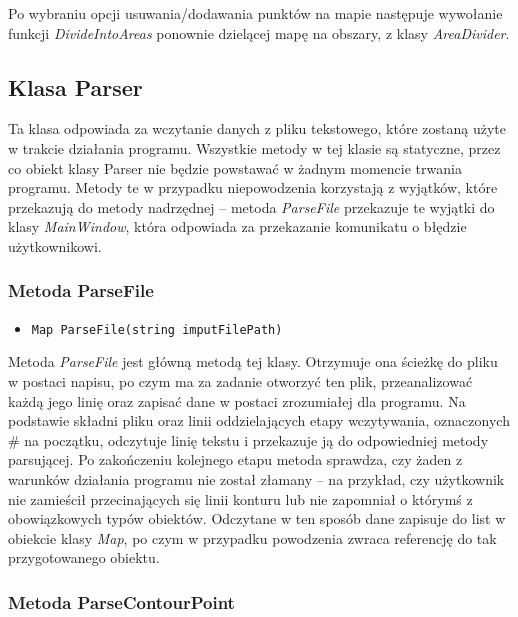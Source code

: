 \documentclass[a4paper,11pt]{article}
\newcommand\tab[1][0.6cm]{\hspace*{#1}}
\begin{document}
Po wybraniu opcji usuwania/dodawania punktów na mapie następuje wywołanie funkcji \textit{DivideIntoAreas} ponownie dzielącej mapę na obszary, z klasy \textit{AreaDivider}.


\subsection{Klasa Parser}

\tab Ta klasa odpowiada za wczytanie danych z pliku tekstowego, które zostaną użyte w trakcie działania programu. Wszystkie metody w tej klasie są statyczne, przez co obiekt klasy Parser nie będzie powstawać w żadnym momencie trwania programu. Metody te w przypadku niepowodzenia korzystają z wyjątków, które przekazują do metody nadrzędnej -- metoda \textit{ParseFile} przekazuje te wyjątki do klasy \textit{MainWindow}, która odpowiada za przekazanie komunikatu o błędzie użytkownikowi.

\subsubsection{Metoda ParseFile}
\begin{itemize}
\item \begin{lstlisting}
Map ParseFile(string imputFilePath) 
\end{lstlisting}
\end{itemize}

Metoda \textit{ParseFile} jest główną metodą tej klasy. Otrzymuje ona ścieżkę do pliku w postaci napisu, po czym ma za zadanie otworzyć ten plik, przeanalizować każdą jego linię oraz zapisać dane w postaci zrozumiałej dla programu. Na podstawie składni pliku oraz linii oddzielających etapy wczytywania, oznaczonych \# na początku, odczytuje linię tekstu i przekazuje ją do odpowiedniej metody parsującej. Po zakończeniu kolejnego etapu metoda sprawdza, czy żaden z warunków działania programu nie został złamany -- na przykład, czy użytkownik nie zamieścił przecinających się linii konturu lub nie zapomniał o którymś z obowiązkowych typów obiektów. Odczytane w ten sposób dane zapisuje do list w obiekcie klasy \textit{Map}, po czym w przypadku powodzenia zwraca referencję do tak przygotowanego obiektu. 


\subsubsection{Metoda ParseContourPoint}
\end{document}
